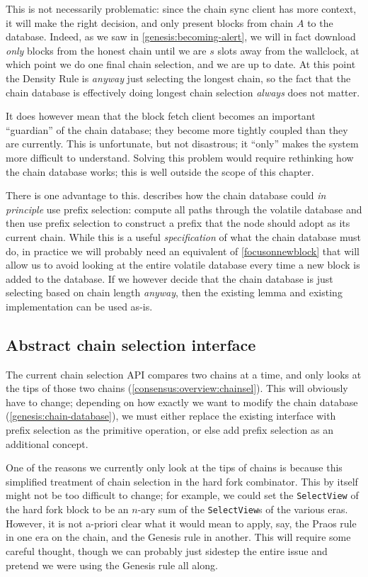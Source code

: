 This is not necessarily problematic: since the chain sync client has more
context, it will make the right decision, and only present blocks from chain $A$
to the database. Indeed, as we saw in \cref{genesis:becoming-alert}, we will
in fact download \emph{only} blocks from the honest chain until we are $s$
slots away from the wallclock, at which point we do one final chain selection,
and we are up to date. At this point the Density Rule is \emph{anyway} just
selecting the longest chain, so the fact that the chain database is effectively
doing longest chain selection \emph{always} does not matter.

It does however mean that the block fetch client becomes an important
``guardian'' of the chain database; they become more tightly coupled than they
are currently. This is unfortunate, but not disastrous; it ``only'' makes the
system more difficult to understand. Solving this problem would require
rethinking how the chain database works; this is well outside the scope of this
chapter.

There is one advantage to this.   describes how
the chain database could \emph{in principle} use prefix selection: compute all
paths through the volatile database and then use prefix selection to construct a
prefix that the node should adopt as its current chain. While this is a useful
\emph{specification} of what the chain database must do, in practice we will
probably need an equivalent of \cref{focusonnewblock} that will allow us to
avoid looking at the entire volatile database every time a new block is added to
the database. If we however decide that the chain database is just selecting
based on chain length \emph{anyway}, then the existing lemma and existing
implementation can be used as-is.


\subsection{Abstract chain selection interface}

The current chain selection API compares two chains at a time, and only looks at
the tips of those two chains (\cref{consensus:overview:chainsel}). This will
obviously have to change; depending on how exactly we want to modify the chain
database (\cref{genesis:chain-database}), we must either replace the existing
interface with prefix selection as the primitive operation, or else add prefix
selection as an additional concept.

One of the reasons we currently only look at the tips of chains is because this
simplified treatment of chain selection in the hard fork combinator. This by
itself might not be too difficult to change; for example, we could set the
\lstinline!SelectView! of the hard fork block to be an $n$-ary sum of the
\lstinline!SelectView!s of the various eras. However, it is not a-priori clear
what it would mean to apply, say, the Praos rule in one era on the chain,
and the Genesis rule in another. This will require some careful thought,
though we can probably just sidestep the entire issue and pretend we were
using the Genesis rule all along.

